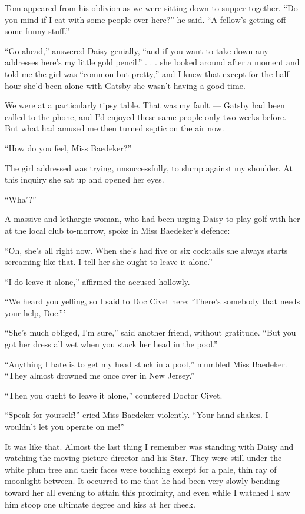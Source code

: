 \documentclass{znotebook}
\begin{document}
Tom appeared from his oblivion as we were sitting down to supper together. ``Do you mind if I eat with some people over here?'' he said. ``A fellow's getting off some funny stuff.''

``Go ahead,'' answered Daisy genially, ``and if you want to take down any addresses here's my little gold pencil.'' . . . she looked around after a moment and told me the girl was ``common but pretty,'' and I knew that except for the half-hour she'd been alone with Gatsby she wasn't having a good time.

We were at a particularly tipsy table. That was my fault ---{} Gatsby had been called to the phone, and I'd enjoyed these same people only two weeks before. But what had amused me then turned septic on the air now.

``How do you feel, Miss Baedeker?''

The girl addressed was trying, unsuccessfully, to slump against my shoulder. At this inquiry she sat up and opened her eyes.

``Wha'?''

A massive and lethargic woman, who had been urging Daisy to play golf with her at the local club to-morrow, spoke in Miss Baedeker's defence:

``Oh, she's all right now. When she's had five or six cocktails she always starts screaming like that. I tell her she ought to leave it alone.''

``I do leave it alone,'' affirmed the accused hollowly.

``We heard you yelling, so I said to Doc Civet here: ‘There's somebody that needs your help, Doc.'''

``She's much obliged, I'm sure,'' said another friend, without gratitude. ``But you got her dress all wet when you stuck her head in the pool.''

``Anything I hate is to get my head stuck in a pool,'' mumbled Miss Baedeker. ``They almost drowned me once over in New Jersey.''

``Then you ought to leave it alone,'' countered Doctor Civet.

``Speak for yourself!'' cried Miss Baedeker violently. ``Your hand shakes. I wouldn't let you operate on me!''

It was like that. Almost the last thing I remember was standing with Daisy and watching the moving-picture director and his Star. They were still under the white plum tree and their faces were touching except for a pale, thin ray of moonlight between. It occurred to me that he had been very slowly bending toward her all evening to attain this proximity, and even while I watched I saw him stoop one ultimate degree and kiss at her cheek.
\end{document}
